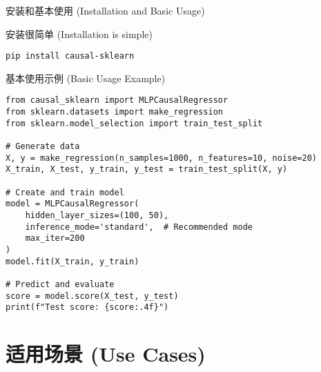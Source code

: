 \documentclass[aspectratio=169,12pt]{beamer}
\begin{document}
\begin{frame}[fragile]{安装和基本使用 (Installation and Basic Usage)}
\begin{block}{安装很简单 (Installation is simple)}
\begin{lstlisting}
pip install causal-sklearn
\end{lstlisting}
\end{block}

\begin{block}{基本使用示例 (Basic Usage Example)}
\begin{lstlisting}
from causal_sklearn import MLPCausalRegressor
from sklearn.datasets import make_regression
from sklearn.model_selection import train_test_split

# Generate data
X, y = make_regression(n_samples=1000, n_features=10, noise=20)
X_train, X_test, y_train, y_test = train_test_split(X, y)

# Create and train model
model = MLPCausalRegressor(
    hidden_layer_sizes=(100, 50),
    inference_mode='standard',  # Recommended mode
    max_iter=200
)
model.fit(X_train, y_train)

# Predict and evaluate
score = model.score(X_test, y_test)
print(f"Test score: {score:.4f}")
\end{lstlisting}
\end{block}
\end{frame}

\section{适用场景 (Use Cases)}
\end{document}

